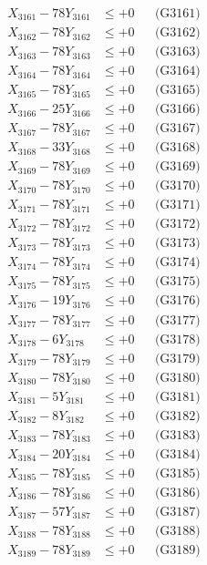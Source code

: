 \documentclass[a4paper,10pt]{article}
\begin{document}
{\begin{align}
X_{3161} - 78Y_{3161} &\leq +0 && \text{(G3161)} \\
X_{3162} - 78Y_{3162} &\leq +0 && \text{(G3162)} \\
X_{3163} - 78Y_{3163} &\leq +0 && \text{(G3163)} \\
X_{3164} - 78Y_{3164} &\leq +0 && \text{(G3164)} \\
X_{3165} - 78Y_{3165} &\leq +0 && \text{(G3165)} \\
X_{3166} - 25Y_{3166} &\leq +0 && \text{(G3166)} \\
X_{3167} - 78Y_{3167} &\leq +0 && \text{(G3167)} \\
X_{3168} - 33Y_{3168} &\leq +0 && \text{(G3168)} \\
X_{3169} - 78Y_{3169} &\leq +0 && \text{(G3169)} \\
X_{3170} - 78Y_{3170} &\leq +0 && \text{(G3170)} \\
\allowbreak
X_{3171} - 78Y_{3171} &\leq +0 && \text{(G3171)} \\
X_{3172} - 78Y_{3172} &\leq +0 && \text{(G3172)} \\
X_{3173} - 78Y_{3173} &\leq +0 && \text{(G3173)} \\
X_{3174} - 78Y_{3174} &\leq +0 && \text{(G3174)} \\
X_{3175} - 78Y_{3175} &\leq +0 && \text{(G3175)} \\
X_{3176} - 19Y_{3176} &\leq +0 && \text{(G3176)} \\
X_{3177} - 78Y_{3177} &\leq +0 && \text{(G3177)} \\
X_{3178} - 6Y_{3178} &\leq +0 && \text{(G3178)} \\
X_{3179} - 78Y_{3179} &\leq +0 && \text{(G3179)} \\
X_{3180} - 78Y_{3180} &\leq +0 && \text{(G3180)} \\
\allowbreak
X_{3181} - 5Y_{3181} &\leq +0 && \text{(G3181)} \\
X_{3182} - 8Y_{3182} &\leq +0 && \text{(G3182)} \\
X_{3183} - 78Y_{3183} &\leq +0 && \text{(G3183)} \\
X_{3184} - 20Y_{3184} &\leq +0 && \text{(G3184)} \\
X_{3185} - 78Y_{3185} &\leq +0 && \text{(G3185)} \\
X_{3186} - 78Y_{3186} &\leq +0 && \text{(G3186)} \\
X_{3187} - 57Y_{3187} &\leq +0 && \text{(G3187)} \\
X_{3188} - 78Y_{3188} &\leq +0 && \text{(G3188)} \\
X_{3189} - 78Y_{3189} &\leq +0 && \text{(G3189)} \\

\end{align}}
\end{document}
